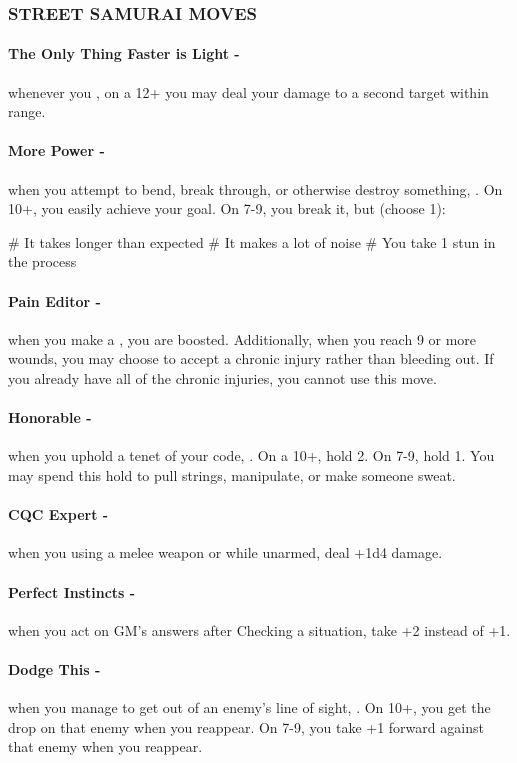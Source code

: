 \subsubsection{STREET SAMURAI MOVES}
\paragraph{The Only Thing Faster is Light -} whenever you , on a 12+ you may deal your damage to a second target within range.

\paragraph{More Power -} when you attempt to bend, break through, or otherwise destroy something, . On 10+, you easily achieve your goal. On 7-9, you break it, but (choose 1):
    \begin{easylist}
        # It takes longer than expected
        # It makes a lot of noise
        # You take 1 stun in the process
    \end{easylist}

\paragraph{Pain Editor -} when you make a , you are boosted. Additionally, when you reach 9 or more wounds, you may choose to accept a chronic injury rather than bleeding out. If you already have all of the chronic injuries, you cannot use this move.

\paragraph{Honorable -} when you uphold a tenet of your code, . On a 10+, hold 2. On 7-9, hold 1. You may spend this hold to pull strings, manipulate, or make someone sweat.

\paragraph{CQC Expert -} when you  using a melee weapon or while unarmed, deal +1d4 damage.

\paragraph{Perfect Instincts -} when you act on GM’s answers after Checking a situation, take +2 instead of +1.

\paragraph{Dodge This -} when you manage to get out of an enemy’s line of sight, . On 10+, you get the drop on that enemy when you reappear. On 7-9, you take +1 forward against that enemy when you reappear.
